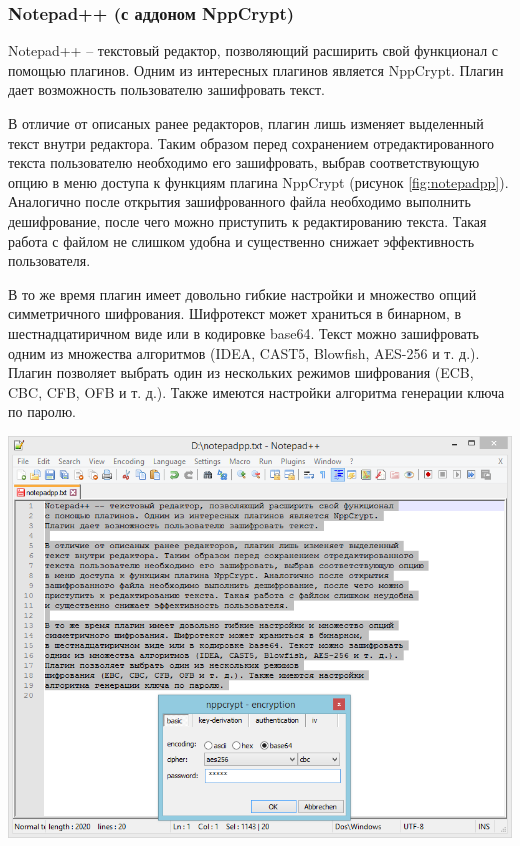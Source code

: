 \subsubsection{Notepad++ (с аддоном NppCrypt)}

Notepad++ -- текстовый редактор, позволяющий расширить свой функционал
с помощью плагинов. Одним из интересных плагинов является NppCrypt.
Плагин дает возможность пользователю зашифровать текст.

В отличие от описаных ранее редакторов, плагин лишь изменяет выделенный
текст внутри редактора. Таким образом перед сохранением отредактированного
текста пользователю необходимо его зашифровать, выбрав соответствующую опцию
в меню доступа к функциям плагина NppCrypt (рисунок \ref{fig:notepadpp}).
Аналогично после открытия зашифрованного файла необходимо выполнить
дешифрование, после чего можно приступить к редактированию текста.
Такая работа с файлом не слишком удобна и существенно снижает
эффективность пользователя.

В то же время плагин имеет довольно гибкие настройки и множество опций
симметричного шифрования. Шифротекст может храниться в бинарном,
в шестнадцатиричном виде или в кодировке base64. Текст можно зашифровать
одним из множества алгоритмов (IDEA, CAST5, Blowfish, AES-256 и т. д.).
Плагин позволяет выбрать один из нескольких режимов
шифрования (ECB, CBC, CFB, OFB и т. д.). Также имеются настройки
алгоритма генерации ключа по паролю.

\noindent
\begin{minipage}{\textwidth}
  \vspace{3.5mm}
  \centering
  \includegraphics[scale=0.6]{./pics/notepadpp-main.png}
  \label{fig:notepadpp}
  \vspace{3.5mm}
\end{minipage}

